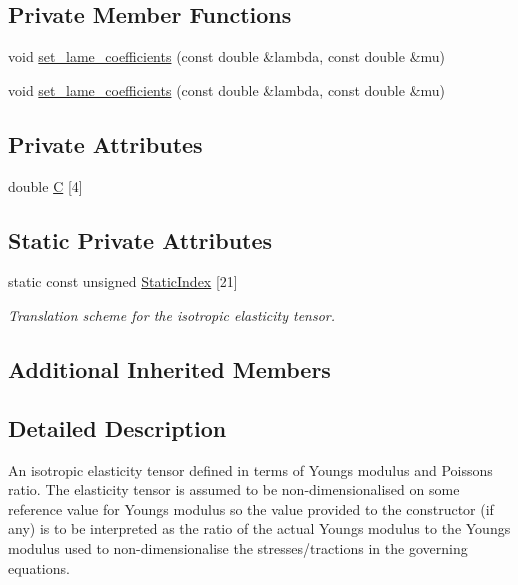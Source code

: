\subsection*{Private Member Functions}
\begin{DoxyCompactItemize}
\item 
void \hyperlink{classoomph_1_1IsotropicElasticityTensor_a3e1d58b606d9ae2883403f24db1bb5b3}{set\+\_\+lame\+\_\+coefficients} (const double \&lambda, const double \&mu)
\item 
void \hyperlink{classoomph_1_1IsotropicElasticityTensor_a3e1d58b606d9ae2883403f24db1bb5b3}{set\+\_\+lame\+\_\+coefficients} (const double \&lambda, const double \&mu)
\end{DoxyCompactItemize}
\subsection*{Private Attributes}
\begin{DoxyCompactItemize}
\item 
double \hyperlink{classoomph_1_1IsotropicElasticityTensor_a7189e7c72bcf36be75a4ba42f0675aff}{C} \mbox{[}4\mbox{]}
\end{DoxyCompactItemize}
\subsection*{Static Private Attributes}
\begin{DoxyCompactItemize}
\item 
static const unsigned \hyperlink{classoomph_1_1IsotropicElasticityTensor_aa100bfbbb893872dcb54c7090800d701}{Static\+Index} \mbox{[}21\mbox{]}
\begin{DoxyCompactList}\small\item\em Translation scheme for the isotropic elasticity tensor. \end{DoxyCompactList}\end{DoxyCompactItemize}
\subsection*{Additional Inherited Members}


\subsection{Detailed Description}
An isotropic elasticity tensor defined in terms of Young\textquotesingle{}s modulus and Poisson\textquotesingle{}s ratio. The elasticity tensor is assumed to be non-\/dimensionalised on some reference value for Young\textquotesingle{}s modulus so the value provided to the constructor (if any) is to be interpreted as the ratio of the actual Young\textquotesingle{}s modulus to the Young\textquotesingle{}s modulus used to non-\/dimensionalise the stresses/tractions in the governing equations. 

